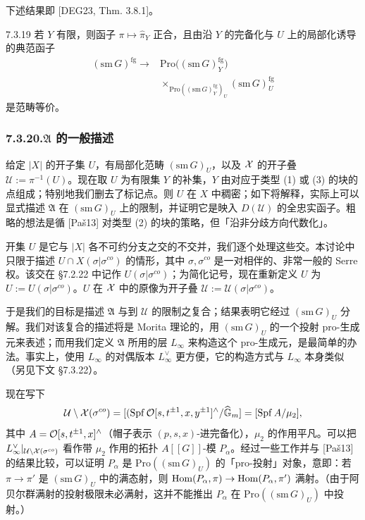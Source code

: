 下述结果即 [DEG23, Thm. 3.8.1]。

\begin{thm}{7.3.19}\label{thm:a4-7-3-19}
若 $Y$ 有限，则函子 $\pi\mapsto\hat\pi_Y$ 正合，且由沿 $Y$ 的完备化与 $U$ 上的局部化诱导的典范函子
\[
\begin{aligned}
(\mathrm{sm}\,G)^{\mathrm{fg}}\longrightarrow{}&\mathrm{Pro}\bigl((\mathrm{sm}\,G)^{\mathrm{fg}}_Y\bigr)\\
&\times_{\mathrm{Pro}((\mathrm{sm}\,G)^{\mathrm{fg}}_Y)_U}(\mathrm{sm}\,G)^{\mathrm{fg}}_U
\end{aligned}
\]
是范畴等价。
\end{thm}

\subsubsection*{7.3.20.\quad $\mathfrak A$ 的一般描述}
给定 $|X|$ 的开子集 $U$，有局部化范畴 $(\mathrm{sm}\,G)_U$，以及 $\mathcal{X}$ 的开子叠 $\mathcal U:=\pi^{-1}(U)$。现在取 $U$ 为有限集 $Y$ 的补集，$Y$ 由对应于类型 (1) 或 (3) 的块的点组成；特别地我们删去了标记点。则 $U$ 在 $X$ 中稠密；如下将解释，实际上可以显式描述 $\mathfrak A$ 在 $(\mathrm{sm}\,G)_U$ 上的限制，并证明它是映入 $D(\mathcal U)$ 的全忠实函子。粗略的想法是循 [Paš13] 对类型 (2) 的块的策略，但「沿非分歧方向代数化」。

开集 $U$ 是它与 $|X|$ 各不可约分支之交的不交并，我们逐个处理这些交。本讨论中只限于描述 $U\cap X(\sigma|\sigma^{co})$ 的情形，其中 $\sigma,\sigma^{co}$ 是一对相伴的、非常一般的 Serre 权。该交在 §7.2.22 中记作 $U(\sigma|\sigma^{co})$；为简化记号，现在重新定义 $U$ 为 $U:=U(\sigma|\sigma^{co})$。$U$ 在 $\mathcal{X}$ 中的原像为开子叠 $\mathcal U:=\mathcal U(\sigma|\sigma^{co})$。

于是我们的目标是描述 $\mathfrak A$ 与到 $\mathcal U$ 的限制之复合；结果表明它经过 $(\mathrm{sm}\,G)_U$ 分解。我们对该复合的描述将是 Morita 理论的，用 $(\mathrm{sm}\,G)_U$ 的一个投射 pro-生成元来表述；而用我们定义 $\mathfrak A$ 所用的层 $L_\infty$ 来构造这个 pro-生成元，是最简单的办法。事实上，使用 $L_\infty$ 的对偶版本 $L^\vee_\infty$ 更方便，它的构造方式与 $L_\infty$ 本身类似（另见下文 §7.3.22）。

现在写下
\[
\mathcal U\setminus\mathcal{X}(\sigma^{co})=[(\operatorname{Spf}\mathcal{O}[s,t^{\pm1},x,y^{\pm1}]^\wedge/\widehat{\mathbb G}_m]=[\operatorname{Spf} A/\mu_2],
\]
其中 $A=\mathcal{O}[s,t^{\pm1},x]^\wedge$（帽子表示 $(p,s,x)$-进完备化），$\mu_2$ 的作用平凡。可以把 $L^\vee_\infty|_{\mathcal U\setminus\mathcal{X}(\sigma^{co})}$ 看作带 $\mu_2$ 作用的拓扑 $A[[G]]$-模 $P_\alpha$。经过一些工作并与 [Paš13] 的结果比较，可以证明 $P_\alpha$ 是 $\mathrm{Pro}((\mathrm{sm}\,G)_U)$ 的「pro-投射」对象，意即：若 $\pi\to\pi'$ 是 $(\mathrm{sm}\,G)_U$ 中的满态射，则 $\operatorname{Hom}(P_\alpha,\pi)\to\operatorname{Hom}(P_\alpha,\pi')$ 满射。（由于阿贝尔群满射的投射极限未必满射，这并不能推出 $P_\alpha$ 在 $\mathrm{Pro}((\mathrm{sm}\,G)_U)$ 中投射。）

